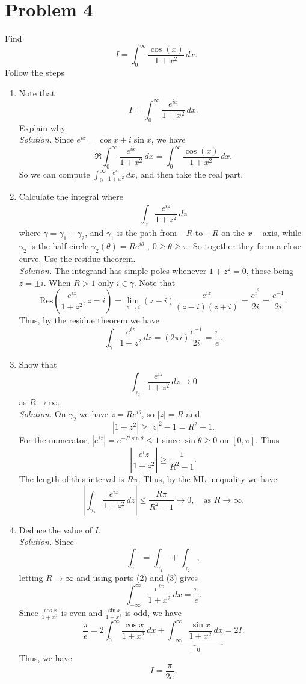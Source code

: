 \documentclass[12pt]{article}
\begin{document}
\section*{Problem 4}
Find
\[
    I=\int_{0}^{\infty}\frac{\cos(x)}{1+x^2}\,dx.
\]
Follow the steps
\begin{enumerate}[label=(\arabic*)]
    \item Note that 
        \[
            I=\int_{0}^{\infty}\frac{e^{ix}}{1+x^2}\,dx.
        \] 
    Explain why.\\
    \textit{Solution.} Since $e^{ix}=\cos x+i\sin x$, we have
    \[
        \Re\int_{0}^{\infty}\frac{e^{ix}}{1+x^2}\,dx=\int_{0}^{\infty}\frac{\cos(x)}{1+x^2}\,dx.
    \]
    So we can compute $\int_{0}^{\infty}\frac{e^{ix}}{1+x^2}\,dx$, and then take the real part. 
    \item Calculate the integral where 
        \[
            \int_\gamma\frac{e^{iz}}{1+z^2}\,dz
        \]
        where $\gamma=\gamma_1+\gamma_2$, and $\gamma_1$ is the path from $-R$ to $+R$ on the $x-$axis, while $\gamma_2$ is the half-circle $\gamma_2(\theta)=Re^{i\theta}$ , $0\geq\theta\geq\pi$. So together they form a close curve. Use the residue theorem.\\
    \textit{Solution.} The integrand has simple poles whenever $1+z^2=0$, those being $z=\pm i$. When $R>1$ only $i\in\gamma$. Note that
    \[
        \mathrm{Res}\left(\frac{e^{iz}}{1+z^2},z=i\right)=\lim_{z\to i}(z-i)\frac{e^{iz}}{(z-i)(z+i)}=\frac{e^{i^2}}{2i}=\frac{e^{-1}}{2i}.
    \]
    Thus, by the residue theorem we have
    \[
        \int_{\gamma}\frac{e^{iz}}{1+z^2}\,dz=(2\pi i)\frac{e^{-1}}{2i}=\frac{\pi}{e}.
    \]
    \item Show that
        \[
            \int_{\gamma_2}\frac{e^{iz}}{1+z^2}\,dz\to0
        \]
        as $R\to\infty$.\\
    \textit{Solution.} On $\gamma_2$ we have $z=Re^{i\theta}$, so $|z|=R$ and
    \[
        |1+z^2|\geq|z|^2-1=R^2-1.
    \]
    For the numerator, $|e^{iz}|=e^{-R\sin\theta}\leq1$ since $\sin\theta\geq0$ on $[0,\pi]$. Thus
    \[
        \left|\frac{e^iz}{1+z^2}\right|\geq\frac{1}{R^2-1}.
    \]
    The length of this interval is $R\pi$. Thus, by the ML-inequality we have
    \[
        \left|\int_{\gamma_2}\frac{e^{iz}}{1+z^2}\,dz\right|\leq\frac{R\pi}{R^2-1}\to 0,\quad \text{as } R\to\infty.
    \]
    \item Deduce the value of $I$.\\
    \textit{Solution.} Since 
    \[
        \int_{\gamma}=\int_{\gamma_1}+\int_{\gamma_2},
    \]
    letting $R\to\infty$ and using parts (2) and (3) gives
    \[
        \int_{-\infty}^{\infty}\frac{e^{ix}}{1+x^2}\,dx=\frac{\pi}{e}.
    \]
    Since $\frac{\cos x}{1+x^2}$ is even and $\frac{\sin x}{1+x^2}$ is odd, we have
    \[
        \frac{\pi}{e}=2\int_{0}^{\infty}\frac{\cos x}{1+x^2}\,dx+\underbrace{\int_{-\infty}^{\infty}\frac{\sin x}{1+x^2}\,dx}_{=0}=2I.
    \]
    Thus, we have
    \[
        I=\frac{\pi}{2e}.
    \]
\end{enumerate}
\end{document}
